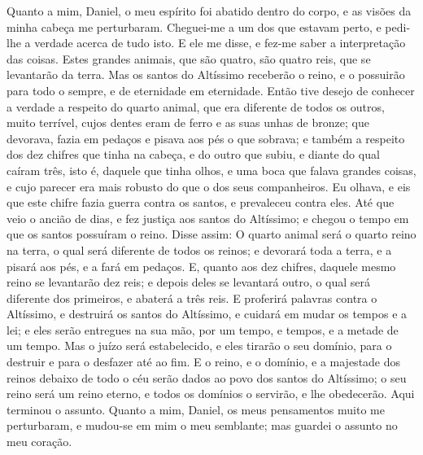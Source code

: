 Quanto a mim, Daniel, o meu espírito foi abatido dentro do corpo,
e as visões da minha cabeça me perturbaram. Cheguei-me a um
dos que estavam perto, e pedi-lhe a verdade acerca de tudo isto. E
ele me disse, e fez-me saber a interpretação das coisas.
Estes grandes animais, que são quatro, são quatro reis, que
se levantarão da terra. Mas os santos do Altíssimo receberão
o reino, e o possuirão para todo o sempre, e de eternidade em
eternidade. Então tive desejo de conhecer a verdade a
respeito do quarto animal, que era diferente de todos os outros,
muito terrível, cujos dentes eram de ferro e as suas unhas de
bronze; que devorava, fazia em pedaços e pisava aos pés o que
sobrava; e também a respeito dos dez chifres que tinha na
cabeça, e do outro que subiu, e diante do qual caíram três, isto é,
daquele que tinha olhos, e uma boca que falava grandes coisas, e
cujo parecer era mais robusto do que o dos seus companheiros.
Eu olhava, e eis que este chifre fazia guerra contra os
santos, e prevaleceu contra eles. Até que veio o ancião de
dias, e fez justiça aos santos do Altíssimo; e chegou o tempo em que
os santos possuíram o reino. Disse assim: O quarto animal
será o quarto reino na terra, o qual será diferente de todos os
reinos; e devorará toda a terra, e a pisará aos pés, e a fará em
pedaços. E, quanto aos dez chifres, daquele mesmo reino se
levantarão dez reis; e depois deles se levantará outro, o qual será
diferente dos primeiros, e abaterá a três reis. E proferirá
palavras contra o Altíssimo, e destruirá os santos do Altíssimo, e
cuidará em mudar os tempos e a lei; e eles serão entregues na sua
mão, por um tempo, e tempos, e a metade de um tempo. Mas o
juízo será estabelecido, e eles tirarão o seu domínio, para o
destruir e para o desfazer até ao fim. E o reino, e o
domínio, e a majestade dos reinos debaixo de todo o céu serão dados
ao povo dos santos do Altíssimo; o seu reino será um reino eterno, e
todos os domínios o servirão, e lhe obedecerão. Aqui terminou
o assunto. Quanto a mim, Daniel, os meus pensamentos muito me
perturbaram, e mudou-se em mim o meu semblante; mas guardei o
assunto no meu coração.

\medskip

